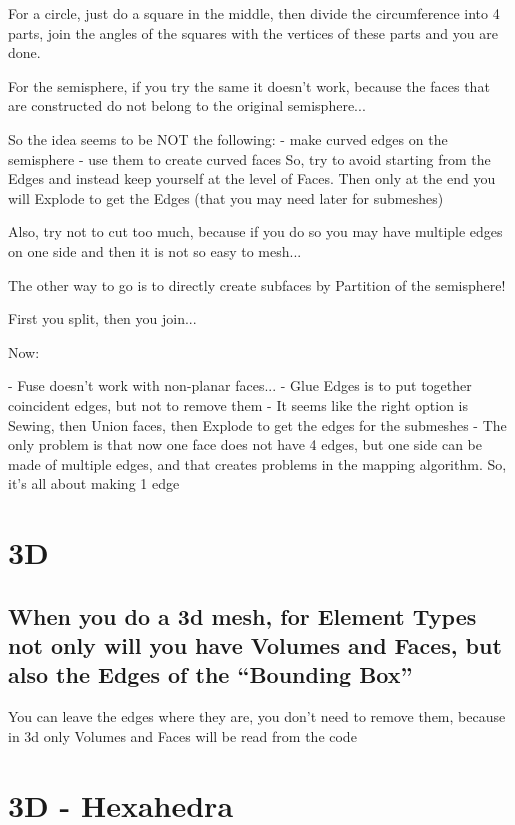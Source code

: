 \documentclass[10pt]{book}
\begin{document}
For a circle, just do a square in the middle, then divide the circumference into 4 parts,
join the angles of the squares with the vertices of these parts and you are done.

For the semisphere, if you try the same it doesn't work, because the faces that are constructed
do not belong to the original semisphere...

So the idea seems to be NOT the following:
 - make curved edges on the semisphere
 - use them to create curved faces
  So, try to avoid starting from the Edges and instead keep yourself at the level of Faces.
  Then only at the end you will Explode to get the Edges (that you may need later for submeshes)
  
  Also, try not to cut too much, because if you do so you may have multiple edges on one side and then it is not so easy to mesh...
 
 The other way to go is to directly create subfaces by Partition of the semisphere!
 
 First you split, then you join...
 
 Now:
 
 - Fuse doesn't work with non-planar faces...
 - Glue Edges is to put together coincident edges, but not to remove them
 - It seems like the right option is Sewing, then Union faces, then Explode to get the edges for the submeshes
 - The only problem is that now one face does not have 4 edges, but one side can be made of multiple edges,
   and that creates problems in the mapping algorithm. So, it's all about making 1 edge
   
\section{3D}


\subsection{When you do a 3d mesh, for Element Types not only will you have Volumes and Faces, but also the Edges of the ``Bounding Box''}

  You can leave the edges where they are, 
  you don't need to remove them,
  because in 3d only Volumes and Faces will be read from the code
 


\section{3D - Hexahedra}
\end{document}
